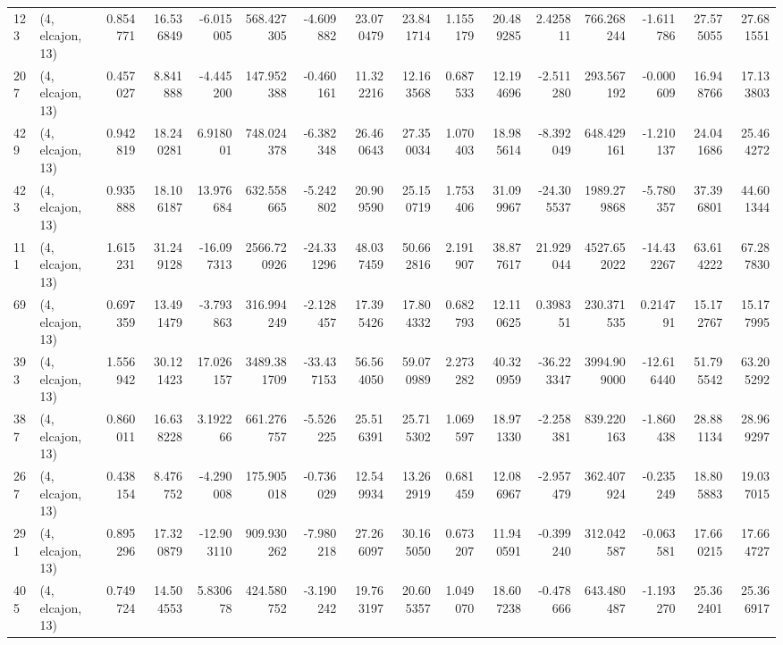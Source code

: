 \begin{tabular}{llrrrrrrrrrrrrrr}
123 &  (4, elcajon, 13) &   0.854771 &  16.536849 &  -6.015005 &   568.427305 &  -4.609882 &  23.070479 &  23.841714 &  1.155179 &  20.489285 &   2.425811 &    766.268244 &   -1.611786 &   27.575055 &   27.681551 \\
207 &  (4, elcajon, 13) &   0.457027 &   8.841888 &  -4.445200 &   147.952388 &  -0.460161 &  11.322216 &  12.163568 &  0.687533 &  12.194696 &  -2.511280 &    293.567192 &   -0.000609 &   16.948766 &   17.133803 \\
429 &  (4, elcajon, 13) &   0.942819 &  18.240281 &   6.918001 &   748.024378 &  -6.382348 &  26.460643 &  27.350034 &  1.070403 &  18.985614 &  -8.392049 &    648.429161 &   -1.210137 &   24.041686 &   25.464272 \\
423 &  (4, elcajon, 13) &   0.935888 &  18.106187 &  13.976684 &   632.558665 &  -5.242802 &  20.909590 &  25.150719 &  1.753406 &  31.099967 & -24.305537 &   1989.279868 &   -5.780357 &   37.396801 &   44.601344 \\
111 &  (4, elcajon, 13) &   1.615231 &  31.249128 & -16.097313 &  2566.720926 & -24.331296 &  48.037459 &  50.662816 &  2.191907 &  38.877617 &  21.929044 &   4527.652022 &  -14.432267 &   63.614222 &   67.287830 \\
69  &  (4, elcajon, 13) &   0.697359 &  13.491479 &  -3.793863 &   316.994249 &  -2.128457 &  17.395426 &  17.804332 &  0.682793 &  12.110625 &   0.398351 &    230.371535 &    0.214791 &   15.172767 &   15.177995 \\
393 &  (4, elcajon, 13) &   1.556942 &  30.121423 &  17.026157 &  3489.381709 & -33.437153 &  56.564050 &  59.070989 &  2.273282 &  40.320959 & -36.223347 &   3994.909000 &  -12.616440 &   51.795542 &   63.205292 \\
387 &  (4, elcajon, 13) &   0.860011 &  16.638228 &   3.192266 &   661.276757 &  -5.526225 &  25.516391 &  25.715302 &  1.069597 &  18.971330 &  -2.258381 &    839.220163 &   -1.860438 &   28.881134 &   28.969297 \\
267 &  (4, elcajon, 13) &   0.438154 &   8.476752 &  -4.290008 &   175.905018 &  -0.736029 &  12.549934 &  13.262919 &  0.681459 &  12.086967 &  -2.957479 &    362.407924 &   -0.235249 &   18.805883 &   19.037015 \\
291 &  (4, elcajon, 13) &   0.895296 &  17.320879 & -12.903110 &   909.930262 &  -7.980218 &  27.266097 &  30.165050 &  0.673207 &  11.940591 &  -0.399240 &    312.042587 &   -0.063581 &   17.660215 &   17.664727 \\
405 &  (4, elcajon, 13) &   0.749724 &  14.504553 &   5.830678 &   424.580752 &  -3.190242 &  19.763197 &  20.605357 &  1.049070 &  18.607238 &  -0.478666 &    643.480487 &   -1.193270 &   25.362401 &   25.366917 \\

\end{tabular}
